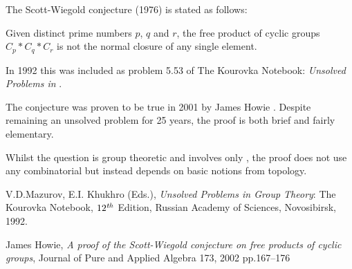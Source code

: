 \documentclass[12pt]{article}
\begin{document}
The Scott-Wiegold conjecture (1976) is stated as follows: 

Given distinct prime numbers $p$, $q$ and $r$, the free product of cyclic groups $C_p * C_q * C_r$ is not the normal closure of any single element.

In 1992 this was included as problem 5.53 of The Kourovka Notebook: {\it Unsolved Problems in } \cite{Kour}.

The conjecture was proven to be true in 2001 by James Howie \cite{Howi}.  Despite remaining an unsolved problem for 25 years, the proof is both brief and fairly elementary.

Whilst the question is group theoretic and involves only , the proof does not use any combinatorial  but instead depends on basic notions from topology.

\begin{thebibliography}{}

 V.D.Mazurov, E.I. Khukhro (Eds.), {\it Unsolved Problems in Group Theory}: The Kourovka Notebook, $12^{\it th}$ Edition, Russian Academy of Sciences, Novosibirsk, 1992.


 James Howie, {\it A proof of the Scott-Wiegold conjecture on free products of cyclic groups}, Journal of Pure and Applied Algebra 173, 2002 pp.167--176


\end{thebibliography}
\end{document}
